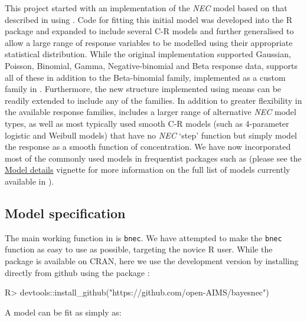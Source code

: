 \documentclass[
]{jss}
\begin{document}
This project started with an implementation of the \emph{NEC} model
based on that described in \citep{Fox2010, Pires2002} using 
\citep{Su2015}. Code for fitting this initial model was developed into
the R package  and expanded to include several C-R models
and further generalised to allow a large range of response variables to
be modelled using their appropriate statistical distribution. While the
original  implementation supported Gaussian, Poisson,
Binomial, Gamma, Negative-binomial and Beta response data,
 supports all of these in addition to the Beta-binomial
family, implemented as a custom family in . Furthermore, the
new structure implemented using  means  can be
readily extended to include any of the  families. In addition
to greater flexibility in the available response families,
 includes a larger range of alternative \emph{NEC} model
types, as well as most typically used smooth C-R models (such as
4-parameter logistic and Weibull models) that have no \emph{NEC} `step'
function but simply model the response as a smooth function of
concentration. We have now incorporated most of the commonly used models
in frequentist packages such as  \citep{Ritz2016} (please see
the
\href{https://open-aims.github.io/bayesnec/articles/example2b.html}{Model
details} vignette for more information on the full list of models
currently available in ).

\hypertarget{model-specification}{%
\subsection{Model specification}\label{model-specification}}

The main working function in  is \texttt{bnec}. We have
attempted to make the \texttt{bnec} function as easy to use as possible,
targeting the novice R user. While the package is available on CRAN,
here we use the development version by installing directly from github
using the package :

\begin{CodeChunk}
\begin{CodeInput}
R> devtools::install_github("https://github.com/open-AIMS/bayesnec")
\end{CodeInput}
\end{CodeChunk}

A  model can be fit as simply as:
\end{document}

